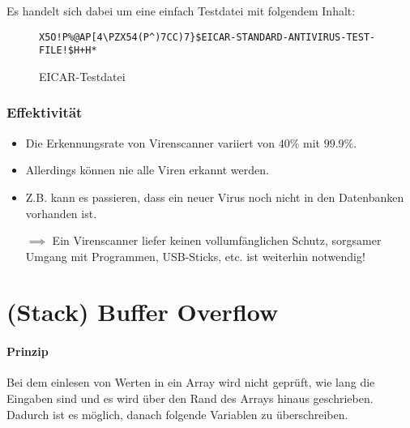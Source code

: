                 Es handelt sich dabei um eine einfach Testdatei mit folgendem Inhalt:
                \begin{figure}[H]
                    \centering
                    \texttt{X5O!P\%@AP[4\textbackslash{}PZX54(P\^{})7CC)7\}\$EICAR-STANDARD-ANTIVIRUS-TEST-FILE!\$H+H*}
                	\caption{EICAR-Testdatei}
                \end{figure}

            \subsubsection{Effektivität}
                \begin{itemize}
                	\item Die Erkennungsrate von Virenscanner variiert von \(40\%\) mit \(99.9\%\).
                	\item Allerdings können nie alle Viren erkannt werden.
                	\item Z.B. kann es passieren, dass ein neuer Virus noch nicht in den Datenbanken vorhanden ist.
                	\item[\(\implies\)] Ein Virenscanner liefer keinen vollumfänglichen Schutz, sorgsamer Umgang mit Programmen, USB-Sticks, etc. ist weiterhin notwendig!
                \end{itemize}

    \section{(Stack) Buffer Overflow}
        \paragraph{Prinzip}
            Bei dem einlesen von Werten in ein Array wird nicht geprüft, wie lang die Eingaben sind und es wird über den Rand des Arrays hinaus geschrieben. Dadurch ist es möglich, danach folgende Variablen zu überschreiben.
        
